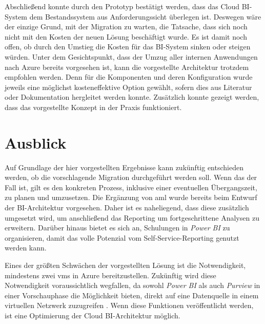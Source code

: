 Abschließend konnte durch den Prototyp bestätigt werden, dass das Cloud BI-System dem Bestandssystem aus Anforderungssicht überlegen ist. Deswegen wäre der einzige Grund, mit der Migration zu warten, die Tatsache, dass sich noch nicht mit den Kosten der neuen Lösung beschäftigt wurde. Es ist damit noch offen, ob durch den Umstieg die Kosten für das BI-System sinken oder steigen würden. Unter dem Gesichtspunkt, dass der Umzug aller internen Anwendungen nach Azure bereits vorgesehen ist, kann die vorgestellte Architektur trotzdem empfohlen werden. Denn für die Komponenten und deren Konfiguration wurde jeweils eine möglichst kosteneffektive Option gewählt, sofern dies aus Literatur oder Dokumentation hergleitet werden konnte. Zusätzlich konnte gezeigt werden, dass das vorgestellte Konzept in der Praxis funktioniert. 

\section{Ausblick}
Auf Grundlage der hier vorgestellten Ergebnisse kann zukünftig entschieden werden, ob die vorschlagende Migration durchgeführt werden soll. Wenn das der Fall ist, gilt es den konkreten Prozess, inklusive einer eventuellen Übergangszeit, zu planen und umzusetzen. Die Ergänzung von \ac{aml} wurde bereits beim Entwurf der BI-Architektur vorgesehen. Daher ist es naheliegend, dass diese zusätzlich umgesetzt wird, um anschließend das Reporting um fortgeschrittene Analysen zu erweitern. Darüber hinaus bietet es sich an, Schulungen in \textit{Power BI} zu organisieren, damit das volle Potenzial vom Self-Service-Reporting genutzt werden kann.

Eines der größten Schwächen der vorgestellten Lösung ist die Notwendigkeit, mindestens zwei \acp{vm} in Azure bereitzustellen. Zukünftig wird diese Notwendigkeit voraussichtlich wegfallen, da sowohl \textit{Power BI} als auch \textit{Purview} in einer Vorschauphase die Möglichkeit bieten, direkt auf eine Datenquelle in einem virtuellen Netzwerk zuzugreifen \cite{msdoc_22_purview_manPE, msdoc_22_pbi_vnetGateway}. Wenn diese Funktionen veröffentlicht werden, ist eine Optimierung der Cloud BI-Architektur möglich.